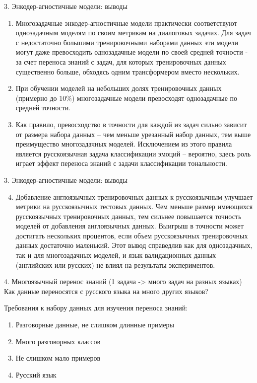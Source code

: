 \begin{frame}{3. Энкодер-агностичные модели: выводы}
\begin{enumerate}
\item Многозадачные энкодер-агностичные модели практически соответствуют однозадачным моделям по своим метрикам на диалоговых задачах. Для задач с недостаточно большими тренировочными наборами данных эти модели могут даже превосходить однозадачные модели по своей средней точности - за счет переноса знаний с задач, для которых тренировочных данных существенно больше, обходясь одним трансформером вместо нескольких.
\item При обучении моделей на небольших долях тренировочных данных (примерно до 10\%) многозадачные модели превосходят однозадачные по средней точности.
\item Как правило, превосходство в точности для каждой из задач сильно зависит от размера набора данных -- чем меньше урезанный набор данных, тем выше преимущество многозадачных моделей. Исключением из этого правила является русскоязычная задача классификации эмоций -- вероятно, здесь роль играет эффект переноса знаний с задачи классификации тональности.
\end{enumerate}
\end{frame}
\begin{frame}{3. Энкодер-агностичные модели: выводы}
\begin{enumerate}
\setcounter{enumi}{3}
\item Добавление англоязычных тренировочных данных к русскоязычным улучшает метрики на русскоязычных тестовых данных. Чем меньше размер имеющихся русскоязычных тренировочных данных, тем сильнее повышается точность моделей от добавления англоязычных данных. Выигрыш в точности может достигать нескольких процентов, если объем русскоязычных тренировочных данных достаточно маленький. Этот вывод справедлив как для однозадачных, так и для многозадачных моделей, и язык валидационных данных (английских или русских) не влиял на результаты экспериментов.
\end{enumerate}
\end{frame}

\begin{frame}{4. Многоязычный перенос знаний (1 задача -> много задач на разных языках)}
Как данные переносятся с русского языка на много других языков? 

Требования к набору данных для изучения переноса знаний: 
\begin{enumerate}
\item {Разговорные данные, не слишком длинные примеры}
\item {Много разговорных классов}
\item {Не слишком мало примеров}
\item{Русский язык}
\end{enumerate}
\end{frame}

